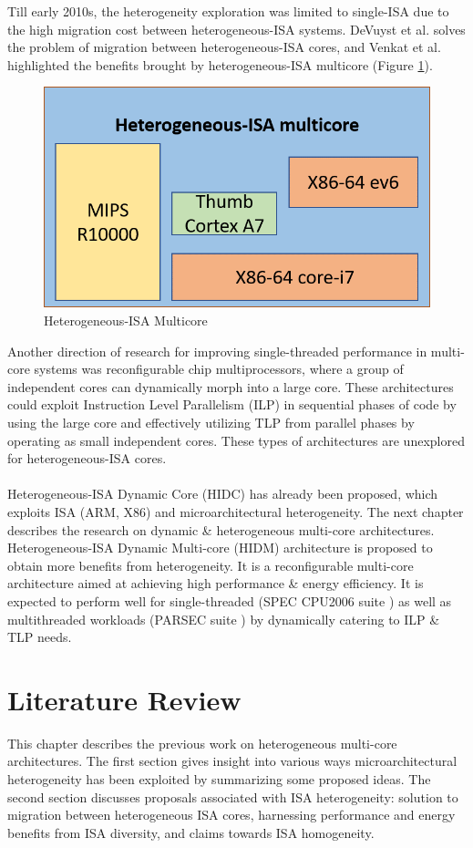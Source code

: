 \documentclass[a4paper,12pt, final]{report}
\begin{document}
\indent Till early 2010s, the heterogeneity exploration was limited to single-ISA due to the high migration cost between heterogeneous-ISA systems. DeVuyst et al. \cite{DeVuystVT12} solves the problem of migration between heterogeneous-ISA cores, and Venkat et al. \cite{venkat} highlighted the benefits brought by heterogeneous-ISA multicore (Figure \ref{hetero-isa-mc}).
\begin{figure}[H]
    \centering
    \includegraphics[width=0.5\linewidth]{hetero-isa-mc.png}
    \caption{Heterogeneous-ISA Multicore}
    \label{hetero-isa-mc}
\end{figure}
\indent Another direction of research for improving single-threaded performance in multi-core systems was reconfigurable chip multiprocessors, where a group of independent cores can dynamically morph into a large core. These architectures could exploit Instruction Level Parallelism (ILP) in sequential phases of code by using the large core and effectively utilizing TLP from parallel phases by operating as small independent cores. These types of architectures are unexplored for heterogeneous-ISA cores.  \\\\
\indent Heterogeneous-ISA Dynamic Core (HIDC) has already been proposed, which exploits ISA (ARM, X86) and microarchitectural heterogeneity. The next chapter describes the research on dynamic \& heterogeneous multi-core architectures. Heterogeneous-ISA Dynamic Multi-core (HIDM) architecture is proposed to obtain more benefits from heterogeneity. It is a reconfigurable multi-core architecture aimed at achieving high performance \& energy efficiency. It is expected to perform well for single-threaded (SPEC CPU2006 suite \cite{speccpu}) as well as multithreaded workloads (PARSEC suite \cite{parsec}) by dynamically catering to ILP \& TLP needs.
\chapter{Literature Review}
This chapter describes the previous work on heterogeneous multi-core architectures. The first section gives insight into various ways microarchitectural heterogeneity has been exploited by summarizing some proposed ideas. The second section discusses proposals associated with ISA heterogeneity: solution to migration between heterogeneous ISA cores, harnessing performance and energy benefits from ISA diversity, and claims towards ISA homogeneity. 
\end{document}
